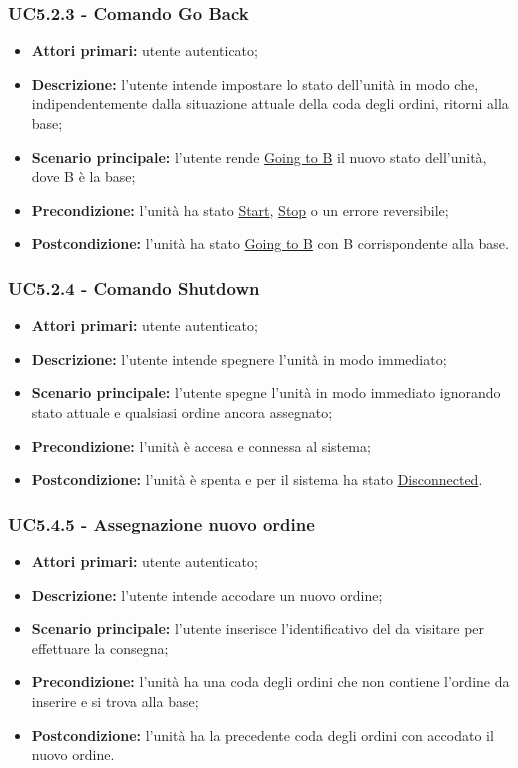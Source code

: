         \subsubsection{UC5.2.3 - Comando Go Back}
        \begin{itemize}
            \item \textbf{Attori primari:} utente autenticato;
            \item \textbf{Descrizione:} l'utente intende impostare lo stato dell'unità in modo che, indipendentemente dalla situazione attuale della coda degli ordini, ritorni alla base;
            \item \textbf{Scenario principale:} l'utente rende \underline{Going to B} il nuovo stato dell'unità, dove B è la base;
            \item \textbf{Precondizione:} l'unità ha stato \underline{Start}, \underline{Stop} o un errore reversibile;
            \item \textbf{Postcondizione:} l'unità ha stato \underline{Going to B} con B corrispondente alla base.
        \end{itemize}

        \subsubsection{UC5.2.4 - Comando Shutdown}
        \begin{itemize}
            \item \textbf{Attori primari:} utente autenticato;
            \item \textbf{Descrizione:} l'utente intende spegnere l'unità in modo immediato;
            \item \textbf{Scenario principale:} l'utente spegne l'unità in modo immediato ignorando stato attuale e qualsiasi ordine ancora assegnato;
            \item \textbf{Precondizione:} l'unità è accesa e connessa al sistema;
            \item \textbf{Postcondizione:} l'unità è spenta e per il sistema ha stato \underline{Disconnected}.
        \end{itemize}

        \subsubsection{UC5.4.5 - Assegnazione nuovo ordine}
        \begin{itemize}
            \item \textbf{Attori primari:} utente autenticato;
            \item \textbf{Descrizione:} l'utente intende accodare un nuovo ordine;
            \item \textbf{Scenario principale:} l'utente inserisce l'identificativo del  da visitare per effettuare la consegna;
            \item \textbf{Precondizione:} l'unità ha una coda degli ordini che non contiene l'ordine da inserire e si trova alla base;
            \item \textbf{Postcondizione:} l'unità ha la precedente coda degli ordini con accodato il nuovo ordine.
        \end{itemize}

